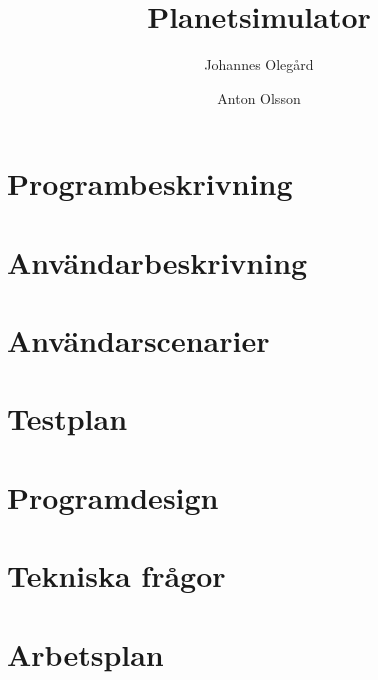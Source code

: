 \documentclass[a4paper, 11pt]{article}
\title{Planetsimulator}
\author{Johannes Olegård \and Anton Olsson}
\begin{document}
\maketitle

\section{Programbeskrivning}


\section{Användarbeskrivning}


\section{Användarscenarier}


\section{Testplan}


\section{Programdesign}


\section{Tekniska frågor}


\section{Arbetsplan}

\end{document}
